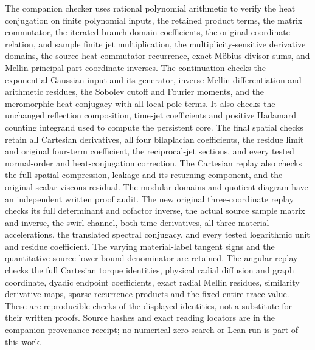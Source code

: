 The companion checker uses rational polynomial arithmetic to verify
the heat conjugation on finite polynomial inputs, the retained
product terms, the matrix commutator, the iterated branch-domain
coefficients, the original-coordinate relation, and sample finite
jet multiplication, the multiplicity-sensitive derivative domains,
the source heat commutator recurrence, exact M\"obius divisor sums,
and Mellin principal-part coordinate inverses.
The continuation checks the exponential Gaussian input and its
generator, inverse Mellin differentiation and arithmetic residues,
the Sobolev cutoff and Fourier moments, and the meromorphic
heat conjugacy with all local pole terms.
It also checks the unchanged reflection composition, time-jet
coefficients and positive Hadamard counting integrand used to
compute the persistent core.
The final spatial checks retain all Cartesian derivatives,
all four bilaplacian coefficients, the residue limit and
original four-term coefficient, the reciprocal-jet sections,
and every tested normal-order and heat-conjugation correction.
The Cartesian replay also checks the full spatial compression,
leakage and its returning component, and the original scalar
viscous residual. The modular domains and quotient diagram have
an independent written proof audit.
The new original three-coordinate replay checks its full
determinant and cofactor inverse, the actual source sample
matrix and inverse, the swirl channel, both time derivatives,
all three material accelerations, the translated spectral
conjugacy, and every tested logarithmic unit and residue
coefficient. The varying material-label tangent signs and
the quantitative source lower-bound denominator are retained.
The angular replay checks the full Cartesian torque identities,
physical radial diffusion and graph coordinate, dyadic endpoint
coefficients, exact radial Mellin residues, similarity derivative
maps, sparse recurrence products and the fixed entire trace value.
These are reproducible checks of the displayed
identities, not a substitute for their written proofs. Source
hashes and exact reading locators are in the companion provenance
receipt; no numerical zero search or Lean run is part of this work.
